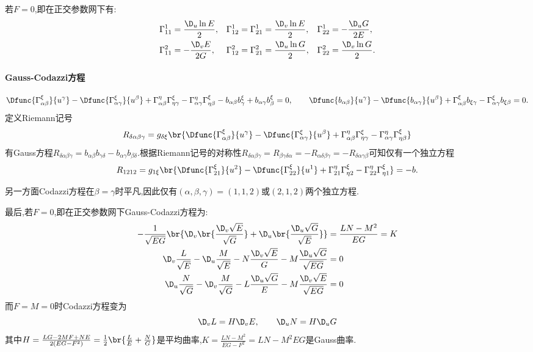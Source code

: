 \documentclass{article}
\begin{document}
若$F=0$,即在正交参数网下有:
$$\begin{aligned}
    \Gamma^1_{11}&=\frac{\D_u \ln E}{2},&\Gamma^1_{12}=\Gamma^1_{21}&=\frac{\D_v \ln E}{2},&\Gamma^1_{22}&=-\frac{\D_u G}{2E},\\
    \Gamma^2_{11}&=-\frac{\D_v E}{2G},&\Gamma^2_{12}=\Gamma^2_{21}&=\frac{\D_u \ln G}{2},&\Gamma^2_{22}&=\frac{\D_v \ln G}{2}.\\
\end{aligned}$$

\paragraph{Gauss-Codazzi方程}
$$\Dfunc{\Gamma^\xi_{\alpha\beta}}{u^\gamma}-\Dfunc{\Gamma^\xi_{\alpha\gamma}}{u^\beta}+\Gamma^\eta_{\alpha\beta}\Gamma^\xi_{\eta\gamma}-\Gamma^\eta_{\alpha\gamma}\Gamma^\xi_{\eta\beta}-b_{\alpha\beta}b^\xi_\gamma+b_{\alpha\gamma}b^\xi_\beta=0,
\qquad \Dfunc{b_{\alpha\beta}}{u^\gamma}-\Dfunc{b_{\alpha\gamma}}{u^\beta}+\Gamma^\xi_{\alpha\beta}b_{\xi\gamma}-\Gamma^\xi_{\alpha\gamma}b_{\xi\beta}=0.$$
定义Riemann记号
$$R_{\delta\alpha\beta\gamma}=g_{\delta\xi}\br{\Dfunc{\Gamma^\xi_{\alpha\beta}}{u^\gamma}-\Dfunc{\Gamma^\xi_{\alpha\gamma}}{u^\beta}+\Gamma^\eta_{\alpha\beta}\Gamma^\xi_{\eta\gamma}-\Gamma^\eta_{\alpha\gamma}\Gamma^\xi_{\eta\beta}}$$
有Gauss方程$R_{\delta\alpha\beta\gamma}=b_{\alpha\beta}b_{\gamma\delta}-b_{\alpha\gamma}b_{\beta\delta}$.根据Riemann记号的对称性$R_{\delta\alpha\beta\gamma}=R_{\beta\gamma\delta\alpha}=-R_{\alpha\delta\beta\gamma}=-R_{\delta\alpha\gamma\beta}$可知仅有一个独立方程
$$R_{1212}=g_{1\xi}\br{\Dfunc{\Gamma^\xi_{21}}{u^2}-\Dfunc{\Gamma^\xi_{22}}{u^1}+\Gamma^\eta_{21}\Gamma^\xi_{\eta 2}-\Gamma^\eta_{22}\Gamma^\xi_{\eta 1}}=-b.$$

另一方面Codazzi方程在$\beta=\gamma$时平凡,因此仅有$(\alpha,\beta,\gamma)=(1,1,2)$或$(2,1,2)$两个独立方程.

最后,若$F=0$,即在正交参数网下Gauss-Codazzi方程为:
$$\begin{aligned}
    -\frac{1}{\sqrt{EG}}\br{\D_v\br{\frac{\D_v\sqrt{E}}{\sqrt{G}}}+\D_u\br{\frac{\D_u\sqrt{G}}{\sqrt{E}}}}&=\frac{LN-M^2}{EG}=K\\
    \D_v\frac{L}{\sqrt{E}}-\D_u\frac{M}{\sqrt{E}}-N\frac{\D_v\sqrt{E}}{G}-M\frac{\D_u\sqrt{G}}{\sqrt{EG}}&=0\\
    \D_u\frac{N}{\sqrt{G}}-\D_v\frac{M}{\sqrt{G}}-L\frac{\D_u\sqrt{G}}{E}-M\frac{\D_v\sqrt{E}}{\sqrt{EG}}&=0
\end{aligned}$$
而$F=M=0$时Codazzi方程变为$$\D_vL=H\D_vE,\qquad \D_uN=H\D_uG$$
其中$H=\frac{LG-2MF+NE}{2(EG-F^2)}=\frac{1}{2}\br{\frac{L}{E}+\frac{N}{G}}$是平均曲率,$K=\frac{LN-M^2}{EG-F^2}={LN-M^2}{EG}$是Gauss曲率.
\end{document}
